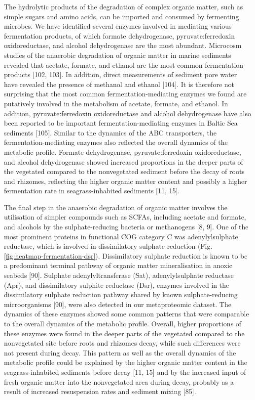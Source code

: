 \documentclass[
  12 pt,
]{article}
\begin{document}
The hydrolytic products of the degradation of complex organic matter, such as simple sugars and amino acids, can be imported and consumed by fermenting microbes. We have identified several enzymes involved in mediating various fermentation products, of which formate dehydrogenase, pyruvate:ferredoxin oxidoreductase, and alcohol dehydrogenase are the most abundant. Microcosm studies of the anaerobic degradation of organic matter in marine sediments revealed that acetate, formate, and ethanol are the most common fermentation products {[}102, 103{]}. In addition, direct measurements of sediment pore water have revealed the presence of methanol and ethanol {[}104{]}. It is therefore not surprising that the most common fermentation-mediating enzymes we found are putatively involved in the metabolism of acetate, formate, and ethanol. In addition, pyruvate:ferredoxin oxidoreductase and alcohol dehydrogenase have also been reported to be important fermentation-mediating enzymes in Baltic Sea sediments {[}105{]}. Similar to the dynamics of the ABC transporters, the fermentation-mediating enzymes also reflected the overall dynamics of the metabolic profile. Formate dehydrogenase, pyruvate:ferredoxin oxidoreductase, and alcohol dehydrogenase showed increased proportions in the deeper parts of the vegetated compared to the nonvegetated sediment before the decay of roots and rhizomes, reflecting the higher organic matter content and possibly a higher fermentation rate in seagrass-inhabited sediments {[}11, 15{]}.

The final step in the anaerobic degradation of organic matter involves the utilisation of simpler compounds such as SCFAs, including acetate and formate, and alcohols by the sulphate-reducing bacteria or methanogens {[}8, 9{]}. One of the most prominent proteins in functional COG category C was adenylylsulphate reductase, which is involved in dissimilatory sulphate reduction (Fig. \ref{fig:heatmap-fermentation-dsr}). Dissimilatory sulphate reduction is known to be a predominant terminal pathway of organic matter mineralisation in anoxic seabeds {[}90{]}. Sulphate adenylyltransferase (Sat), adenylylsulphate reductase (Apr), and dissimilatory sulphite reductase (Dsr), enzymes involved in the dissimilatory sulphate reduction pathway shared by known sulphate-reducing microorganisms {[}90{]}, were also detected in our metaproteomic dataset. The dynamics of these enzymes showed some common patterns that were comparable to the overall dynamics of the metabolic profile. Overall, higher proportions of these enzymes were found in the deeper parts of the vegetated compared to the nonvegetated site before roots and rhizomes decay, while such differences were not present during decay. This pattern as well as the overall dynamics of the metabolic profile could be explained by the higher organic matter content in the seagrass-inhabited sediments before decay {[}11, 15{]} and by the increased input of fresh organic matter into the nonvegetated area during decay, probably as a result of increased resuspension rates and sediment mixing {[}85{]}.
\end{document}
